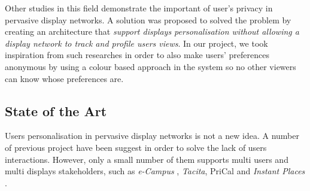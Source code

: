 \documentclass[]{usiinfbachelorproject}
\begin{document}
Other studies in this field demonstrate the important of user's privacy in pervasive display networks. A solution was proposed to \cite{personalisation_and_privacy} solved the problem by creating an architecture that \emph{support displays personalisation without allowing a display network to track and profile users views}.
In our project, we took inspiration from such researches in order to also make users' preferences anonymous by using a colour based approach in the system so no other viewers can know whose preferences are. 

%
%


% 
%
 
\subsection{State of the Art}
Users personalisation in pervasive display networks is not a new idea. A number of previous project have been suggest in order to solve the lack of users interactions. However, only a small number of them supports multi users and multi displays stakeholders, such as \emph{e-Campus} \cite{e_campus}, \emph{Tacita}, PriCal \cite{pri_cal} and \emph{Instant Places} \cite{pins_and_posters}.
\end{document}
